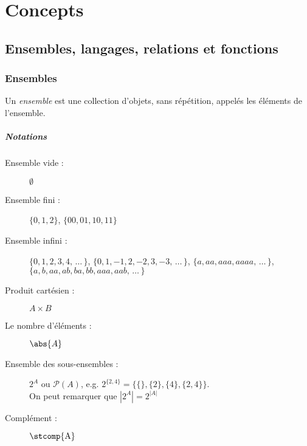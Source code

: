 
\chapter{Concepts}
\label{ch:concepts}

\section{Ensembles, langages, relations et fonctions}
\label{sec:ensembles_langages_relations_et_fonctions}

\subsection{Ensembles}
\label{subsec:ensembles}
Un \emph{ensemble} est une collection d'objets, sans répétition,
appelés les éléments de l'ensemble.
\paragraph{Notations}

\begin{description}
	\item [Ensemble vide :] $\emptyset$
	\item [Ensemble fini :] $\{ 0, 1, 2\}$, $\{00, 01, 10, 11\}$
	\item [Ensemble infini :] $\{ 0, 1, 2, 3, 4,\, \ldots\,\}$, $\{0, 1, -1, 2, -2, 3, -3, \, \ldots\,\}$,
	\subitem $\{a, aa, aaa, aaaa,\, \ldots\,\}$, $\{a, b, aa, ab, ba, bb, aaa, aab, \, \ldots\,\}$
	\item [Produit cartésien :] $A \times B$
    \item [Le nombre d'éléments :] $\abs{A}$
    \item [Ensemble des sous-ensembles :] $2^A$ ou $\mathcal{P}(A)$, e.g. $2^{\{2,4\}} = \{\{\}, \{2\}, \{4\}, \{2,4\}\}$. \\
      On peut remarquer que $|2^A| = 2^{|A|}$
	\item [Complément :] $\stcomp{\mathrm{A}}$
\end{description}


